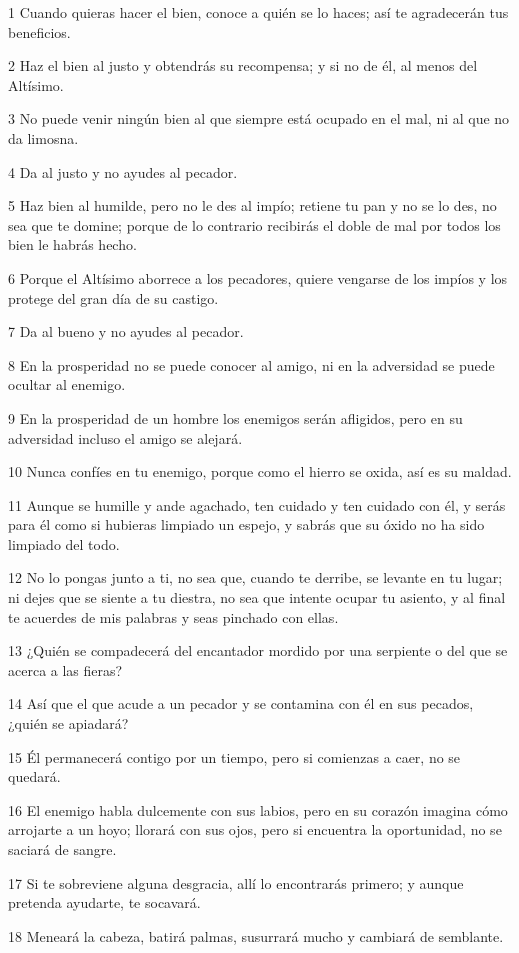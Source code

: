 \par 1 Cuando quieras hacer el bien, conoce a quién se lo haces; así te agradecerán tus beneficios.
\par 2 Haz el bien al justo y obtendrás su recompensa; y si no de él, al menos del Altísimo.
\par 3 No puede venir ningún bien al que siempre está ocupado en el mal, ni al que no da limosna.
\par 4 Da al justo y no ayudes al pecador.
\par 5 Haz bien al humilde, pero no le des al impío; retiene tu pan y no se lo des, no sea que te domine; porque de lo contrario recibirás el doble de mal por todos los bien le habrás hecho.
\par 6 Porque el Altísimo aborrece a los pecadores, quiere vengarse de los impíos y los protege del gran día de su castigo.
\par 7 Da al bueno y no ayudes al pecador.
\par 8 En la prosperidad no se puede conocer al amigo, ni en la adversidad se puede ocultar al enemigo.
\par 9 En la prosperidad de un hombre los enemigos serán afligidos, pero en su adversidad incluso el amigo se alejará.
\par 10 Nunca confíes en tu enemigo, porque como el hierro se oxida, así es su maldad.
\par 11 Aunque se humille y ande agachado, ten cuidado y ten cuidado con él, y serás para él como si hubieras limpiado un espejo, y sabrás que su óxido no ha sido limpiado del todo.
\par 12 No lo pongas junto a ti, no sea que, cuando te derribe, se levante en tu lugar; ni dejes que se siente a tu diestra, no sea que intente ocupar tu asiento, y al final te acuerdes de mis palabras y seas pinchado con ellas.
\par 13 ¿Quién se compadecerá del encantador mordido por una serpiente o del que se acerca a las fieras?
\par 14 Así que el que acude a un pecador y se contamina con él en sus pecados, ¿quién se apiadará?
\par 15 Él permanecerá contigo por un tiempo, pero si comienzas a caer, no se quedará.
\par 16 El enemigo habla dulcemente con sus labios, pero en su corazón imagina cómo arrojarte a un hoyo; llorará con sus ojos, pero si encuentra la oportunidad, no se saciará de sangre.
\par 17 Si te sobreviene alguna desgracia, allí lo encontrarás primero; y aunque pretenda ayudarte, te socavará.
\par 18 Meneará la cabeza, batirá palmas, susurrará mucho y cambiará de semblante.

